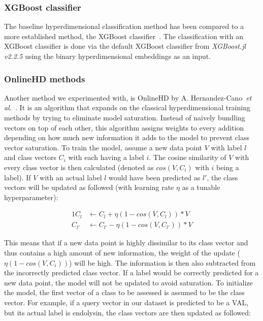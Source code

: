 \subsubsection*{XGBoost classifier}
The baseline hyperdimensional classification method has been compared to a more established method, the XGBoost classifier~\cite{xgboost}. The classification with an XGBoost classifier is done via the default XGBoost classifier from \textit{XGBoost.jl v2.2.5} using the binary hyperdimensional embeddings as an input.
\subsubsection*{OnlineHD methods}
Another method we experimented with, is OnlineHD by A. Hernandez-Cano~\textit{et al.}~\cite{onlinehd}. It is an algorithm that expands on the classical hyperdimensional training methods by trying to eliminate model saturation. Instead of naively bundling vectors on top of each other, this algorithm assigns weights to every addition depending on how much new information it adds to the model to prevent class vector saturation. To train the model, assume a new data point $V$ with label $l$ and class vectors $C_{i}$ with each having a label $i$. The cosine similarity of $V$ with every class vector is then calculated (denoted as $cos(V, C_{i})$ with $i$ being a label). If $V$ with an actual label $l$ would have been predicted as $l'$, the class vectors will be updated as followed (with learning rate $\eta$ as a tunable hyperparameter):

\begin{alignat}{1}
    \label{eqn:onlinehd}
    C_{l} &\leftarrow C_{l} + \eta (1 - cos(V , C_{l})) * V \\
    C_{l'} &\leftarrow C_{l'} - \eta (1 - cos(V, C_{l'})) * V
\end{alignat}

This means that if a new data point is highly dissimilar to its class vector and thus contains a high amount of new information, the weight of the update ($\eta (1 - cos(V, C_{i}))$) will be high. The information is then also subtracted from the incorrectly predicted class vector. If a label would be correctly predicted for a new data point, the model will not be updated to avoid saturation. To initialize the model, the first vector of a class to be assessed is assumed to be the class vector. For example, if a query vector in our dataset is predicted to be a VAL, but its actual label is endolysin, the class vectors are then updated as followed:

